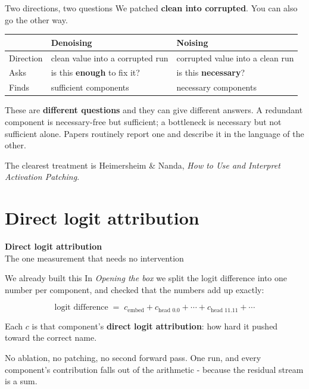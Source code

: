 \documentclass[aspectratio=169]{beamer}
\newcommand{\keybox}[1]{%
  \begin{tcolorbox}[colback=armblue!8, colframe=armblue, boxrule=0.6pt, arc=2pt]
  #1
  \end{tcolorbox}}
\newcommand{\trapbox}[1]{%
  \begin{tcolorbox}[colback=armred!8, colframe=armred, boxrule=0.6pt, arc=2pt]
  #1
  \end{tcolorbox}}
\newcommand{\sectiontransition}[2]{%
  \begin{frame}[plain]
    \vfill
    \begin{center}
      {\Huge\bfseries\color{popblue} #1}\\[1.1em]
      {\large #2}
    \end{center}
    \vfill
  \end{frame}}
\begin{document}
\begin{frame}{Two directions, two questions}
  \vspace{0.6em}
  We patched \textbf{clean into corrupted}. You can also go the other way.

  \vspace{0.7em}
  \begin{center}
  \small
  \begin{tabular}{@{}p{}p{}p{}@{}}
    \toprule
    & \textbf{Denoising} & \textbf{Noising}\\
    \midrule
    Direction & clean value into a corrupted run & corrupted value into a clean run\\[0.5em]
    Asks & is this \textbf{enough} to fix it? & is this \textbf{necessary}?\\[0.5em]
    Finds & sufficient components & necessary components\\
    \bottomrule
  \end{tabular}
  \end{center}

  \vspace{0.9em}
  \trapbox{These are \textbf{different questions} and they can give different answers. A
  redundant component is necessary-free but sufficient; a bottleneck is necessary but not
  sufficient alone. Papers routinely report one and describe it in the language of the other.}

  \vspace{0.5em}
  {\footnotesize The clearest treatment is Heimersheim \& Nanda, \emph{How to Use and Interpret
  Activation Patching}.}
\end{frame}

\section{Direct logit attribution}
\sectiontransition{Direct logit attribution}{The one measurement that needs no intervention}

\begin{frame}{We already built this}
  \vspace{0.7em}
  In \emph{Opening the box} we split the logit difference into one number per component, and
  checked that the numbers add up exactly:

  \vspace{0.5em}
  \[
    \text{logit difference} \;=\; c_{\text{embed}} + c_{\text{head 0.0}} + \cdots +
      c_{\text{head 11.11}} + \cdots
  \]

  \vspace{0.8em}
  Each $c$ is that component's \textbf{direct logit attribution}: how hard it pushed toward the
  correct name.

  \vspace{0.9em}
  \keybox{No ablation, no patching, no second forward pass. One run, and every component's
  contribution falls out of the arithmetic - because the residual stream is a sum.}
\end{frame}
\end{document}
